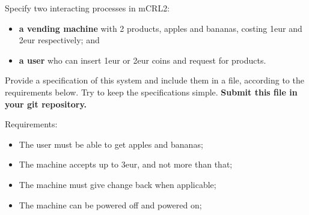 \documentclass[11pt]{article}
\begin{document}
\begin{myExercise} \label{ex:vm}
Specify two interacting processes in mCRL2:
\begin{itemize}
  \item \textbf{a vending machine} with 2 products, apples and bananas, costing 1eur and 2eur respectively; and
  \item \textbf{a user} who can insert 1eur or 2eur coins and request for products.
\end{itemize}

Provide a specification of this system and include them in a  file, according to the requirements below. Try to keep the specifications simple. \textbf{Submit this file in your git repository.}

Requirements:
\begin{itemize}
  \item The user must be able to get apples and bananas;
  \item The machine accepts up to 3eur, and not more than that;
  \item The machine must give change back when applicable;
  \item The machine can be powered off and powered on;
\end{itemize}

\end{myExercise}
\end{document}
